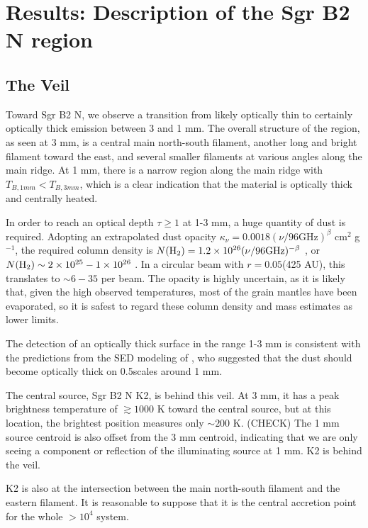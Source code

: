 \documentclass[twocolumn]{aastex61}
\begin{document}
\section{Results: Description of the Sgr B2 N region}
\subsection{The Veil}
\label{sec:theveil}
Toward Sgr B2 N, we observe a transition from likely optically thin to
certainly optically thick emission between 3 and 1 mm.  The overall structure
of the region, as seen at 3 mm, is a central main north-south filament, another
long and bright filament toward the east, and several smaller filaments at
various angles along the main ridge.  At 1 mm, there is a narrow region along
the main ridge with $T_{B,1 mm} < T_{B,3 mm}$, which is a clear indication
that the material is optically thick and centrally heated.

In order to reach an optical depth $\tau\geq1$ at 1-3 mm, a huge quantity of
dust is required.  Adopting an extrapolated dust opacity $\kappa_\nu = 0.0018
(\nu/96 \mathrm{GHz})^{\beta}$ cm$^2$ g$^{-1}$, the required column density is
$N(\textrm{H}_{2}) = 1.2\times10^{26} (\nu/96 \mathrm{GHz})^{-\beta}$ \persc, or $N(\textrm{H}_{2}) \sim
2\times10^{25} - 1\times10^{26}$ \persc.  In a circular beam with $r=0.05$\arcsec (425 AU),
this translates to $\sim6-35$ \msun per beam.  The opacity is highly uncertain,
as it is likely that, given the high observed temperatures, most of the grain
mantles have been evaporated, so it is safest to regard these column density
and mass estimates as lower limits.

The detection of an optically thick surface in the range 1-3 mm is consistent
with the predictions from the SED modeling of \citet{Schmiedeke2016a}, who
suggested that the dust should become optically thick on 0.5\arcsec scales
around 1 mm.

The central source, Sgr B2 N K2, is behind this veil.  At 3 mm, it has a peak
brightness temperature of $\gtrsim1000$ K toward the central source, but at this
location, the brightest position measures only $\sim200$ K.  (CHECK) The 1 mm 
source centroid is also offset from the 3 mm centroid, indicating that we are
only seeing a component or reflection of the illuminating source at 1 mm.
K2 is behind the veil.

K2 is also at the intersection between the main north-south filament and the
eastern filament.  It is reasonable to suppose that it is the central
accretion point for the whole $>10^4$ \msun system.
\end{document}
